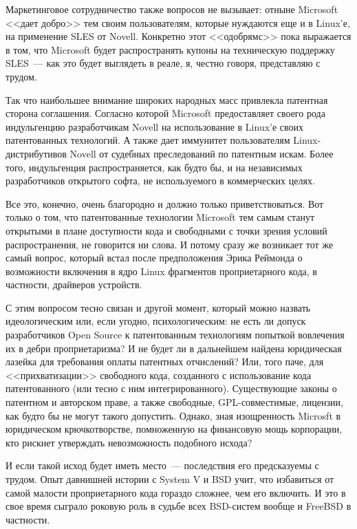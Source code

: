 Маркетинговое сотрудничество также вопросов не вызывает: отныне Microsoft <<дает добро>> тем своим пользователям, которые нуждаются еще и в Linux'е, на применение SLES от Novell. Конкретно этот <<одобрямс>> пока выражается в том, что Microsoft будет распространять купоны на техническую поддержку SLES~--- как это будет выглядеть в реале, я, честно говоря, представляю с трудом.

Так что наибольшее внимание широких народных масс привлекла патентная сторона соглашения. Согласно которой Microsoft предоставляет своего рода индульгенцию разработчикам Novell на использование в Linux'е своих патентованных технологий. А также дает иммунитет пользователям Linux-дистрибутивов Novell от судебных преследований по патентным искам. Более того, индульгенция распространяется, как будто бы, и на независимых разработчиков открытого софта, не используемого в коммерческих целях.

Все это, конечно, очень благородно и должно только приветствоваться. Вот только о том, что патентованные технологии Microsoft тем самым станут открытыми в плане доступности кода и свободными с точки зрения условий распространения, не говорится ни слова. И потому сразу же возникает тот же самый вопрос, который встал после предположения Эрика Реймонда о возможности включения в ядро Linux фрагментов проприетарного кода, в частности, драйверов устройств.

С этим вопросом тесно связан и другой момент, который можно назвать идеологическим или, если угодно, психологическим: не есть ли допуск разработчиков Open Source к патентованным технологиям попыткой вовлечения их в дебри проприетаризма? И не будет ли в дальнейшем найдена юридическая лазейка для требования оплаты патентных отчислений? Или, того паче, для <<прихватизации>> свободного кода, созданного с использование кода патентованного (или тесно с ним интегрированного). Существующие законы о патентном и авторском праве, а также свободные, GPL-совместимые, лицензии, как будто бы не могут такого допустить. Однако, зная изощренность Microsft в юридическом крючкотворстве, помноженную на финансовую мощь корпорации, кто рискнет утверждать невозможность подобного исхода?

И если такой исход будет иметь место~--- последствия его предсказуемы с трудом. Опыт давнишней истории с System V и BSD учит, что избавиться от самой малости проприетарного кода гораздо сложнее, чем его включить. И это в свое время сыграло роковую роль в судьбе всех BSD-систем вообще и FreeBSD в частности.

